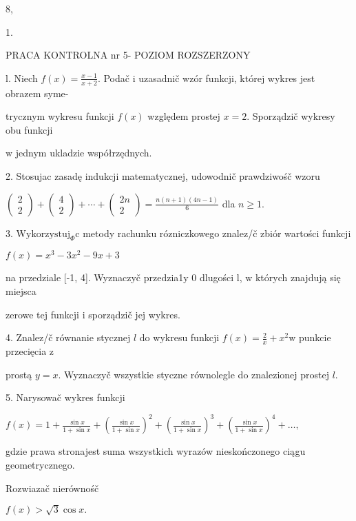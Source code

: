 \documentclass[a4paper,12pt]{article}
\begin{document}
8,

1.




PRACA KONTROLNA nr 5- POZIOM ROZSZERZONY

l. Niech $f(x)=\displaystyle \frac{x-1}{x+2}$. Podač $\mathrm{i}$ uzasadnič wzór funkcji, której wykres jest obrazem syme-

trycznym wykresu funkcji $f(x)$ względem prostej $x=2$. Sporządzič wykresy obu funkcji

$\mathrm{w}$ jednym ukladzie współrzędnych.

2. Stosujac zasadę indukcji matematycznej, udowodnič prawdziwośč wzoru

$\left(\begin{array}{l}
2\\
2
\end{array}\right) +\left(\begin{array}{l}
4\\
2
\end{array}\right)+\cdots+\left(\begin{array}{l}
2n\\
2
\end{array}\right) =\displaystyle \frac{n(n+1)(4n-1)}{6}$ dla $n\geq 1.$

3. $\mathrm{W}\mathrm{y}\mathrm{k}\mathrm{o}\mathrm{r}\mathrm{z}\mathrm{y}\mathrm{s}\mathrm{t}\mathrm{u}\mathrm{j}_{\Phi}\mathrm{c}$ metody rachunku rózniczkowego znalez/č zbiór wartości funkcji

$f(x)=x^{3}-3x^{2}-9x+3$

na przedziale [-1, 4]. Wyznaczyč przedzia1y $0$ dlugości l, $\mathrm{w}$ których znajdują się miejsca

zerowe tej funkcji $\mathrm{i}$ sporządzič jej wykres.

4. Znalez/č równanie stycznej $l$ do wykresu funkcji $f(x) = \displaystyle \frac{2}{x}+x^{2}\mathrm{w}$ punkcie przecięcia $\mathrm{z}$

prostą $y=x$. Wyznaczyč wszystkie styczne równolegle do znalezionej prostej $l.$

5. Narysowač wykres funkcji

$f(x)=1+\displaystyle \frac{\sin x}{1+\sin x}+(\frac{\sin x}{1+\sin x})^{2}+(\frac{\sin x}{1+\sin x})^{3}+(\frac{\sin x}{1+\sin x})^{4}+\ldots,$

gdzie prawa stronajest suma wszystkich wyrazów nieskończonego ciągu geometrycznego.

Rozwiazač nierównośč

$f(x)>\sqrt{3}\cos x.$
\end{document}
